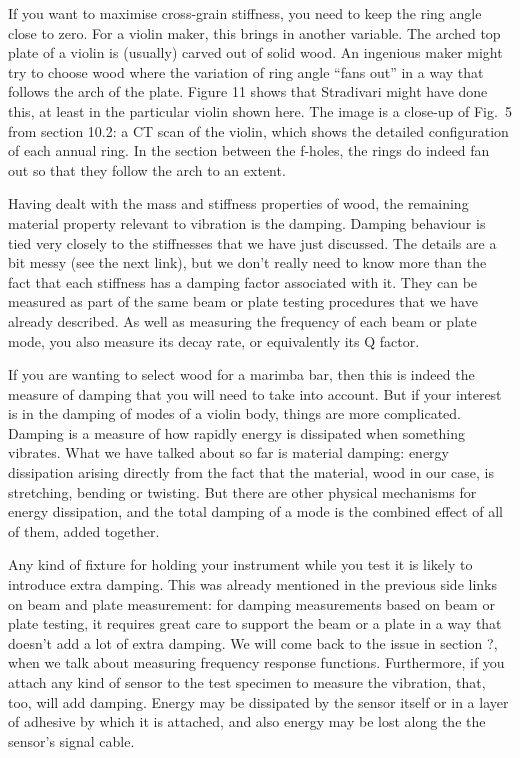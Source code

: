   If you want to maximise cross-grain stiffness, you need to keep the ring 
  angle close to zero. For a violin maker, this brings in another variable. The 
  arched top plate of a violin is (usually) carved out of solid wood. An 
  ingenious maker might try to choose wood where the variation of ring angle 
  “fans out” in a way that follows the arch of the plate. Figure 11 shows that 
  Stradivari might have done this, at least in the particular violin shown 
  here. The image is a close-up of Fig.\ 5 from section 10.2: a CT scan of the 
  violin, which shows the detailed configuration of each annual ring. In the 
  section between the f-holes, the rings do indeed fan out so that they follow 
  the arch to an extent. 


  Having dealt with the mass and stiffness properties of wood, the remaining 
  material property relevant to vibration is the damping. Damping behaviour is 
  tied very closely to the stiffnesses that we have just discussed. The details 
  are a bit messy (see the next link), but we don’t really need to know more 
  than the fact that each stiffness has a damping factor associated with it. 
  They can be measured as part of the same beam or plate testing procedures 
  that we have already described. As well as measuring the frequency of each 
  beam or plate mode, you also measure its decay rate, or equivalently its Q 
  factor. 

  If you are wanting to select wood for a marimba bar, then this is indeed the 
  measure of damping that you will need to take into account. But if your 
  interest is in the damping of modes of a violin body, things are more 
  complicated. Damping is a measure of how rapidly energy is dissipated when 
  something vibrates. What we have talked about so far is material damping: 
  energy dissipation arising directly from the fact that the material, wood in 
  our case, is stretching, bending or twisting. But there are other physical 
  mechanisms for energy dissipation, and the total damping of a mode is the 
  combined effect of all of them, added together. 

  Any kind of fixture for holding your instrument while you test it is likely 
  to introduce extra damping. This was already mentioned in the previous side 
  links on beam and plate measurement: for damping measurements based on beam 
  or plate testing, it requires great care to support the beam or a plate in a 
  way that doesn’t add a lot of extra damping. We will come back to the issue 
  in section ?, when we talk about measuring frequency response functions. 
  Furthermore, if you attach any kind of sensor to the test specimen to measure 
  the vibration, that, too, will add damping. Energy may be dissipated by the 
  sensor itself or in a layer of adhesive by which it is attached, and also 
  energy may be lost along the the sensor’s signal cable. 

